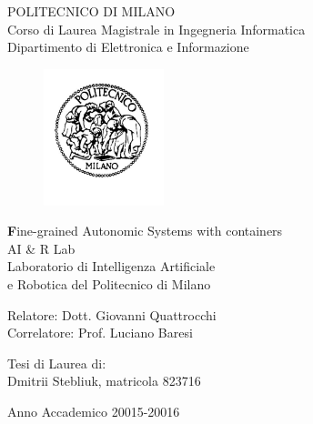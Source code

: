 \thispagestyle{empty}
\vspace*{-1.5cm} \bfseries{
\begin{center}
  \large
  POLITECNICO DI MILANO\\
  \normalsize
  Corso di Laurea Magistrale in Ingegneria Informatica\\
  Dipartimento di Elettronica e Informazione\\
  \begin{figure}[htbp]
    \begin{center}
      \includegraphics[width=3.5cm]{./pictures/logopm}
    \end{center}
  \end{figure}
  \vspace*{0.3cm} \LARGE



  \textbf Fine-grained Autonomic Systems with containers\\



  \vspace*{.75truecm} \large
  AI \& R Lab \\
  Laboratorio di Intelligenza Artificiale \\
  e Robotica del Politecnico di Milano
\end{center}
\vspace*{3.0cm} \large
\begin{flushleft}


  Relatore: Dott. Giovanni Quattrocchi \\
  Correlatore: Prof. Luciano Baresi 

\end{flushleft}
\vspace*{1.0cm}
\begin{flushright}


  Tesi di Laurea di:\\ Dmitrii Stebliuk, matricola 823716 \\ 


\end{flushright}
\vspace*{0.5cm}
\begin{center}



  Anno Accademico 20015-20016
\end{center} \clearpage
}
